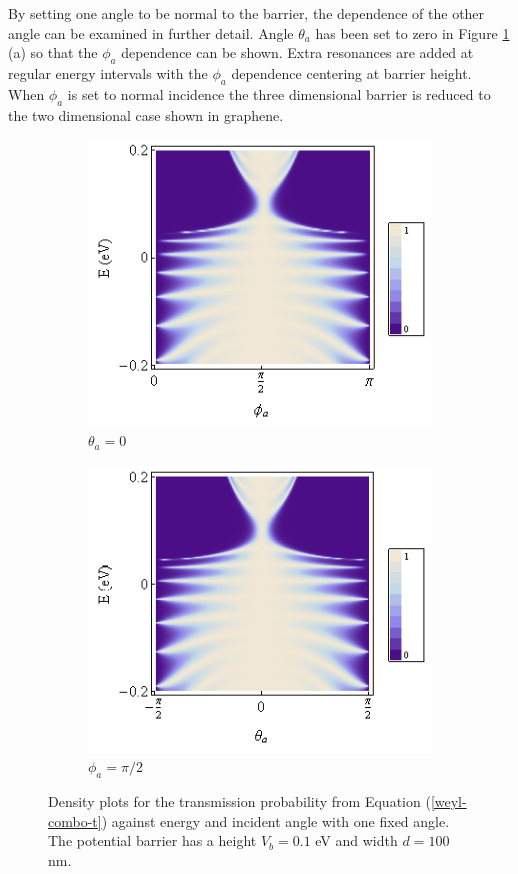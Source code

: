 		By setting one angle to be normal to the barrier, the dependence of the other angle can be examined in further detail. Angle $\theta_{a}$ has been set to zero in Figure \ref{weyl-3} (a) so that the $\phi_{a}$ dependence can be shown. Extra resonances are added at regular energy intervals with the $\phi_{a}$ dependence centering at barrier height. When $\phi_{a}$ is set to normal incidence the three dimensional barrier is reduced to the two dimensional case shown in graphene.
		\begin{figure}[h]
			 \begin{subfigure}[h]{0.5\textwidth}
				\centerline{\includegraphics[scale=0.5]{images/weyl-bar-phi}}
				\caption{$\theta_{a}=0$}
			\end{subfigure}
			\hspace{0.5cm}
			\begin{subfigure}[h]{0.5\textwidth}
				\centerline{\includegraphics[scale=0.5]{images/weyl-bar-theta}}
				\caption{$\phi_{a}=\pi/2$}
			\end{subfigure}
			\caption{Density plots for the transmission probability from Equation (\ref{weyl-combo-t}) against energy and incident angle with one fixed angle. The potential barrier has a height $V_{b}=0.1$ eV and width $d=100$ nm.}
			\label{weyl-3}
		\end{figure}
